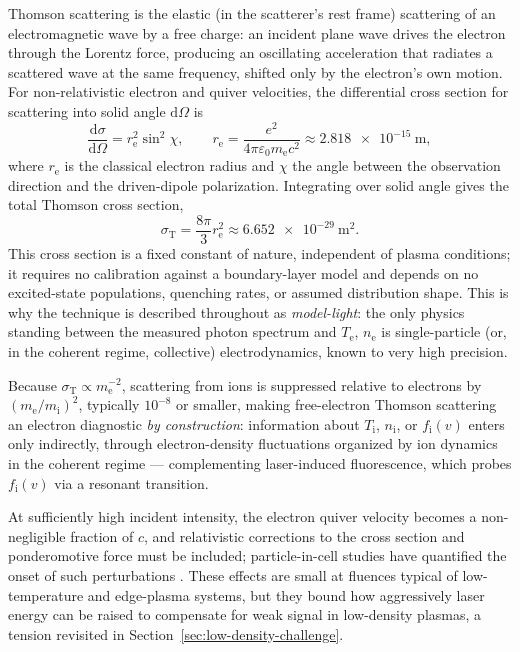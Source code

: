 Thomson scattering is the elastic (in the scatterer's rest frame) scattering of an electromagnetic wave by a free charge: an incident plane wave drives the electron through the Lorentz force, producing an oscillating acceleration that radiates a scattered wave at the same frequency, shifted only by the electron's own motion. For non-relativistic electron and quiver velocities, the differential cross section for scattering into solid angle $\mathrm{d}\Omega$ is
\begin{equation}
\frac{\mathrm{d}\sigma}{\mathrm{d}\Omega} = r_{\mathrm{e}}^{2}\sin^{2}\chi ,
\qquad
r_{\mathrm{e}} = \frac{e^{2}}{4\pi\varepsilon_{0} m_{\mathrm{e}} c^{2}} \approx \SI{2.818e-15}{\meter},
\label{eq:thomson-diff-xsec}
\end{equation}
where $r_{\mathrm{e}}$ is the classical electron radius and $\chi$ the angle between the observation direction and the driven-dipole polarization. Integrating over solid angle gives the total Thomson cross section,
\begin{equation}
\sigma_{\mathrm{T}} = \frac{8\pi}{3} r_{\mathrm{e}}^{2} \approx \SI{6.652e-29}{\meter\squared}.
\label{eq:thomson-total-xsec}
\end{equation}
This cross section is a fixed constant of nature, independent of plasma conditions; it requires no calibration against a boundary-layer model and depends on no excited-state populations, quenching rates, or assumed distribution shape. This is why the technique is described throughout as \emph{model-light}: the only physics standing between the measured photon spectrum and $T_{\mathrm{e}}$, $n_{\mathrm{e}}$ is single-particle (or, in the coherent regime, collective) electrodynamics, known to very high precision.

Because $\sigma_{\mathrm{T}} \propto m_{\mathrm{e}}^{-2}$, scattering from ions is suppressed relative to electrons by $(m_{\mathrm{e}}/m_{\mathrm{i}})^{2}$, typically $10^{-8}$ or smaller, making free-electron Thomson scattering an electron diagnostic \emph{by construction}: information about $T_{\mathrm{i}}$, $n_{\mathrm{i}}$, or $f_{\mathrm{i}}(v)$ enters only indirectly, through electron-density fluctuations organized by ion dynamics in the coherent regime — complementing laser-induced fluorescence, which probes $f_{\mathrm{i}}(v)$ via a resonant transition.

At sufficiently high incident intensity, the electron quiver velocity becomes a non-negligible fraction of $c$, and relativistic corrections to the cross section and ponderomotive force must be included; particle-in-cell studies have quantified the onset of such perturbations \cite{ref0360}. These effects are small at fluences typical of low-temperature and edge-plasma systems, but they bound how aggressively laser energy can be raised to compensate for weak signal in low-density plasmas, a tension revisited in Section~\ref{sec:low-density-challenge}.

